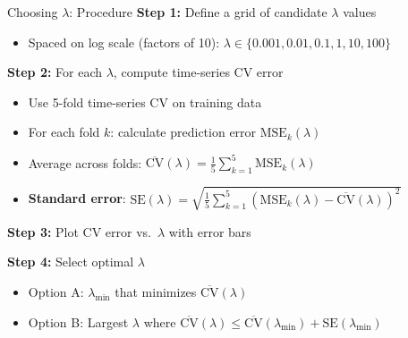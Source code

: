 \documentclass[10pt]{beamer}
\newcommand{\highlight}[1]{\textcolor{AccentOrange}{\textbf{#1}}}
\begin{document}

\begin{frame}{Choosing $\lambda$: Procedure}
\textbf{Step 1:} Define a grid of candidate $\lambda$ values
\begin{itemize}
  \item Spaced on log scale (factors of 10): $\lambda \in \{0.001, 0.01, 0.1, 1, 10, 100\}$
\end{itemize}

\vspace{0.5em}
\textbf{Step 2:} For each $\lambda$, compute time-series CV error
\begin{itemize}
  \item Use 5-fold time-series CV on training data
  \item For each fold $k$: calculate prediction error $\text{MSE}_k(\lambda)$
  \item Average across folds: $\overline{\text{CV}}(\lambda) = \frac{1}{5}\sum_{k=1}^5 \text{MSE}_k(\lambda)$
  \item \highlight{Standard error}: $\text{SE}(\lambda) = \sqrt{\frac{1}{5}\sum_{k=1}^5 (\text{MSE}_k(\lambda) - \overline{\text{CV}}(\lambda))^2}$
\end{itemize}

\vspace{0.5em}
\textbf{Step 3:} Plot CV error vs.\ $\lambda$ with error bars

\vspace{0.5em}
\textbf{Step 4:} Select optimal $\lambda$
\begin{itemize}
  \item Option A: $\lambda_{\min}$ that minimizes $\overline{\text{CV}}(\lambda)$
  \item Option B: Largest $\lambda$ where $\overline{\text{CV}}(\lambda) \leq \overline{\text{CV}}(\lambda_{\min}) + \text{SE}(\lambda_{\min})$
\end{itemize}
\end{frame}

\end{document}
